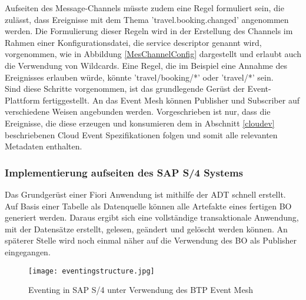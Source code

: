   Aufseiten des Message-Channels müsste zudem eine Regel formuliert sein, die zulässt, dass Ereignisse mit dem Thema 'travel.booking.changed' angenommen werden. Die Formulierung dieser Regeln wird in der Erstellung des Channels im Rahmen einer Konfigurationsdatei, die service descriptor genannt wird, vorgenommen, wie in Abbildung \ref{MesChannelConfig} dargestellt und erlaubt auch die Verwendung von Wildcards. Eine Regel, die im Beispiel eine Annahme des Ereignisses erlauben würde, könnte 'travel/booking/*' oder 'travel/*' sein.\\

  Sind diese Schritte vorgenommen, ist das grundlegende Gerüst der Event-Plattform fertiggestellt. An das Event Mesh können Publisher und Subscriber auf verschiedene Weisen angebunden werden. Vorgeschrieben ist nur, dass die Ereignisse, die diese erzeugen und konsumieren dem in Abschnitt \ref{cloudev} beschriebenen Cloud Event Spezifikationen folgen und somit alle relevanten Metadaten enthalten.\\

  \subsubsection*{Implementierung aufseiten des SAP S/4 Systems}
  Das Grundgerüst einer Fiori Anwendung ist mithilfe der \ac{ADT} schnell erstellt. Auf Basis einer Tabelle als Datenquelle können alle Artefakte eines fertigen \ac{BO} generiert werden. Daraus ergibt sich eine vollständige transaktionale Anwendung, mit der Datensätze erstellt, gelesen, geändert und gelöscht werden können. An späterer Stelle wird noch einmal näher auf die Verwendung des \ac{BO} als Publisher eingegangen.\\
  \begin{figure}[H]
    \centering
    \texttt{[image: eventingstructure.jpg]}
    \caption[Eventing in SAP S/4]{Eventing in SAP S/4 unter Verwendung des BTP Event Mesh \footnotemark}
    \label{BEstructure}
  \end{figure}

